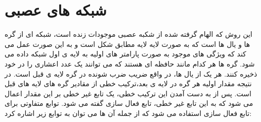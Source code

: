 \section{شبکه های عصبی}


این روش که الهام گرفته شده از شکبه عصبی موجودات زنده است، شبکه ای از گره ها و یال ها است که به صورت لایه لایه مطابق شکل
است
و به این صورت عمل می کند که ویژگی های موجود به صورت پارامتر های اولیه به لایه ی اول شبکه داده می شود.
گره ها هر کدام مانند حافظه ای هستند که می توانند یک عدد اعشاری را در خود ذخیره کنند. هر یک از یال ها، در واقع ضریب ضرب شونده در گره لایه ی قبل است. در نتیجه مقدار اولیه هر گره در لایه ی بعد،‌ترکیب خطی از مقادیر گره های لایه های قبل است. پس از به دست آمدن این ترکیب خطی، یک تابع غیر خطی بر این مقدار اعمال می شود که به این تابع غیر خطی،‌ تابع فعال سازی
گفته می شود. توابع متفاوتی برای تابع فعال سازی استفاده می شود که از جمله آن ها می توان به توابع زیر اشاره کرد:

